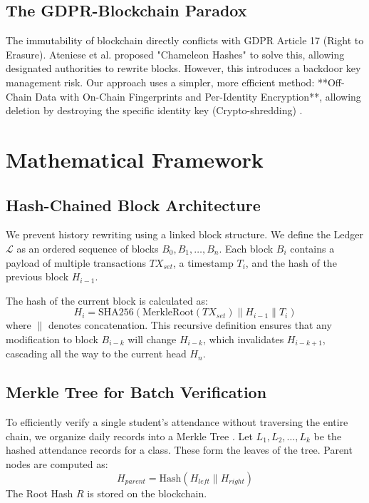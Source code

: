 \documentclass[conference]{IEEEtran}
\begin{document}
\subsection{The GDPR-Blockchain Paradox}
The immutability of blockchain directly conflicts with GDPR Article 17 (Right to Erasure). Ateniese et al. \cite{b10} proposed "Chameleon Hashes" to solve this, allowing designated authorities to rewrite blocks. However, this introduces a backdoor key management risk. Our approach uses a simpler, more efficient method: **Off-Chain Data with On-Chain Fingerprints and Per-Identity Encryption**, allowing deletion by destroying the specific identity key (Crypto-shredding) \cite{b8}.

\section{Mathematical Framework}

\subsection{Hash-Chained Block Architecture}
We prevent history rewriting using a linked block structure. We define the Ledger $\mathcal{L}$ as an ordered sequence of blocks $B_0, B_1, \dots, B_n$.
Each block $B_i$ contains a payload of multiple transactions $TX_{set}$, a timestamp $T_i$, and the hash of the previous block $H_{i-1}$.

The hash of the current block is calculated as:
\begin{equation}
H_i = \text{SHA256}( \text{MerkleRoot}(TX_{set}) \parallel H_{i-1} \parallel T_i )
\end{equation}
where $\parallel$ denotes concatenation. This recursive definition ensures that any modification to block $B_{i-k}$ will change $H_{i-k}$, which invalidates $H_{i-k+1}$, cascading all the way to the current head $H_n$.

\subsection{Merkle Tree for Batch Verification}
To efficiently verify a single student's attendance without traversing the entire chain, we organize daily records into a Merkle Tree \cite{b6}.
Let $L_1, L_2, \dots, L_k$ be the hashed attendance records for a class. These form the leaves of the tree.
Parent nodes are computed as:
\begin{equation}
H_{parent} = \text{Hash}(H_{left} \parallel H_{right})
\end{equation}
The Root Hash $R$ is stored on the blockchain. 
\end{document}
